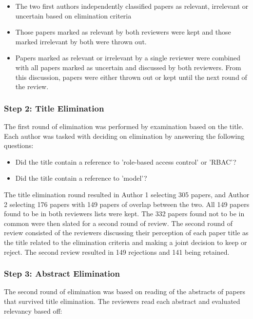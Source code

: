\begin{itemize}
\setlength{\itemsep}{0.25pt}
\item The two first authors independently classified papers as relevant, irrelevant or uncertain based on elimination criteria
\item Those papers marked as relevant by both reviewers were kept and those marked irrelevant by both were thrown out.
\item Papers marked as relevant or irrelevant by a single reviewer were combined with all papers marked as uncertain and discussed by both reviewers.  From this discussion, papers were either thrown out or kept until the next round of the review.
\end{itemize}

\subsubsection{Step 2: Title Elimination}

The first round of elimination was performed by examination based on the title.  Each author was tasked with deciding on elimination by answering the following questions:

\begin{itemize}
\setlength{\itemsep}{0.25pt}
\item Did the title contain a reference to 'role-based access control' or 'RBAC'? 
\item Did the title contain a reference to 'model'?
\end{itemize}

The title elimination round resulted in Author 1 selecting 305 papers, and Author 2 selecting 176 papers with 149 papers of overlap between the two. 
All 149 papers found to be in both reviewers lists were kept. 
The 332 papers found not to be in common were then slated for a second round of review. 
The second round of review consisted of the reviewers discussing their perception of each paper title as the title related to the elimination criteria and making a joint decision to keep or reject. 
The second review resulted in 149 rejections and 141 being retained.

\subsubsection{Step 3: Abstract Elimination}

The second round of elimination was based on reading of the abstracts of papers that survived title elimination. 
The reviewers read each abstract and evaluated relevancy based off:

